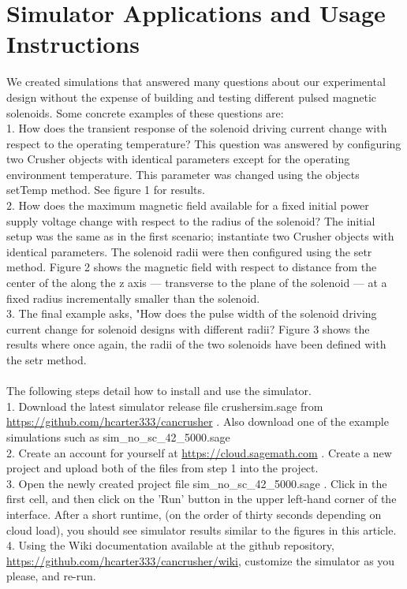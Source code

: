 \documentclass[prb,preprint]{revtex4-1}
\begin{document}
\section{Simulator Applications and Usage Instructions}
We created simulations that answered many questions about our experimental design without the expense of building and testing different pulsed magnetic solenoids.  Some concrete examples of these questions are: 
\\
1.  How does the transient response of the solenoid driving current change with respect to the operating temperature? This question was answered by configuring two Crusher objects with identical parameters except for the operating environment temperature.  This parameter was changed using the objects setTemp method.  See figure 1 for results.
\\
2.  How does the maximum magnetic field available for a fixed initial power supply voltage change with respect to the radius of the solenoid? The initial setup was the same as in the first scenario; instantiate two Crusher objects with identical parameters.  The solenoid radii were then configured using the setr method.  Figure 2 shows the magnetic field with respect to distance from the center of the along the z axis --- transverse to the plane of the solenoid --- at a fixed radius incrementally smaller than the solenoid. 
\\
3.  The final example asks, "How does the pulse width  of the solenoid driving current change for solenoid designs with different radii? Figure 3 shows the results where once again, the radii of the two solenoids have been defined with the setr method. 
\\
\\
The following steps detail how to install and use the simulator.
\\
1.  Download the latest simulator release file crushersim.sage from \url{https://github.com/hcarter333/cancrusher} .  Also download one of the example simulations such as sim\_no\_sc\_42\_5000.sage
\\
2.  Create an account for yourself at \url{https://cloud.sagemath.com} .  Create a new project and upload both of the files from step 1 into the project.
\\
3.  Open the newly created project file sim\_no\_sc\_42\_5000.sage .  Click in the first cell, and then click on the 'Run' button in the upper left-hand corner of the interface.  After a short runtime, (on the order of thirty seconds depending on cloud load), you should see simulator results similar to the figures in this article.
\\
4.  Using the Wiki documentation available at the github repository, \url{https://github.com/hcarter333/cancrusher/wiki}, customize the simulator as you please, and re-run.
\end{document}
